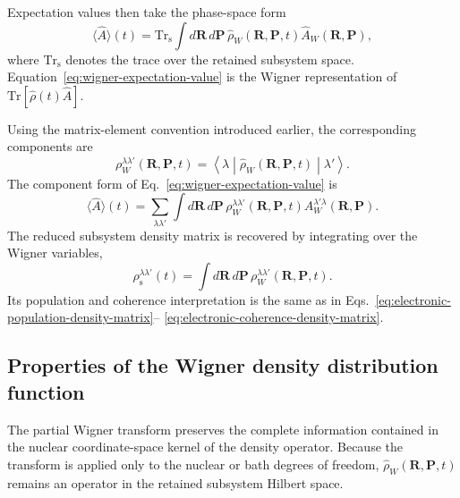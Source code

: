 \documentclass[
  11pt,
  letterpaper,
  onehalfspacing,
  normalmargins,
  equalmargins,
  oneside
]{ut-thesis}
\begin{document}
Expectation values then take the phase-space form
\begin{equation}
\langle \hat A\rangle(t)
=
\mathrm{Tr}_{\mathrm s}
\int d\mathbf R\,d\mathbf P\,
\hat\rho_W(\mathbf R,\mathbf P,t)
\hat A_W(\mathbf R,\mathbf P),
\label{eq:wigner-expectation-value}
\end{equation}
where \(\mathrm{Tr}_{\mathrm s}\) denotes the trace over the retained subsystem
space. Equation~\eqref{eq:wigner-expectation-value} is the Wigner
representation of \(\mathrm{Tr}[\hat\rho(t)\hat A]\).

Using the matrix-element convention introduced earlier, the corresponding
components are
\begin{equation}
\rho_W^{\lambda\lambda'}(\mathbf R,\mathbf P,t)
=
\left\langle
\lambda
\middle|
\hat\rho_W(\mathbf R,\mathbf P,t)
\middle|
\lambda'
\right\rangle .
\label{eq:matrix-valued-wigner-density-elements}
\end{equation}
The component form of Eq.~\eqref{eq:wigner-expectation-value} is
\begin{equation}
\langle \hat A\rangle(t)
=
\sum_{\lambda\lambda'}
\int d\mathbf R\,d\mathbf P\,
\rho_W^{\lambda\lambda'}(\mathbf R,\mathbf P,t)
A_W^{\lambda'\lambda}(\mathbf R,\mathbf P).
\label{eq:matrix-valued-wigner-expectation-value}
\end{equation}
The reduced subsystem density matrix is recovered by integrating over the
Wigner variables,
\begin{equation}
\rho_{\mathrm s}^{\lambda\lambda'}(t)
=
\int d\mathbf R\,d\mathbf P\,
\rho_W^{\lambda\lambda'}(\mathbf R,\mathbf P,t).
\label{eq:reduced-density-from-wigner-density}
\end{equation}
Its population and coherence interpretation is the same as in
Eqs.~\eqref{eq:electronic-population-density-matrix}--
\eqref{eq:electronic-coherence-density-matrix}.

\subsection{Properties of the Wigner density distribution function}
\label{subsec:wigner-density-properties}

The partial Wigner transform preserves the complete information contained in
the nuclear coordinate-space kernel of the density operator. Because the
transform is applied only to the nuclear or bath degrees of freedom,
\(\hat\rho_W(\mathbf R,\mathbf P,t)\) remains an operator in the retained
subsystem Hilbert space.
\end{document}

